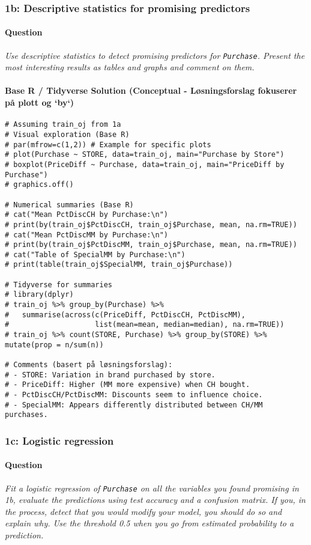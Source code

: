 \documentclass[12pt,a4paper]{article}
\newcommand{\Rcode}[1]{\texttt{#1}} %
\begin{document}
    \subsubsection{1b: Descriptive statistics for promising predictors}
        \paragraph{Question}
        \textit{Use descriptive statistics to detect promising predictors for \Rcode{Purchase}. Present the most interesting results as tables and graphs and comment on them.}
        \paragraph{Base R / Tidyverse Solution (Conceptual - Løsningsforslag fokuserer på plott og `by`)}
\begin{lstlisting}
# Assuming train_oj from 1a
# Visual exploration (Base R)
# par(mfrow=c(1,2)) # Example for specific plots
# plot(Purchase ~ STORE, data=train_oj, main="Purchase by Store")
# boxplot(PriceDiff ~ Purchase, data=train_oj, main="PriceDiff by Purchase")
# graphics.off()

# Numerical summaries (Base R)
# cat("Mean PctDiscCH by Purchase:\n")
# print(by(train_oj$PctDiscCH, train_oj$Purchase, mean, na.rm=TRUE))
# cat("Mean PctDiscMM by Purchase:\n")
# print(by(train_oj$PctDiscMM, train_oj$Purchase, mean, na.rm=TRUE))
# cat("Table of SpecialMM by Purchase:\n")
# print(table(train_oj$SpecialMM, train_oj$Purchase))

# Tidyverse for summaries
# library(dplyr)
# train_oj %>% group_by(Purchase) %>% 
#   summarise(across(c(PriceDiff, PctDiscCH, PctDiscMM), 
#                    list(mean=mean, median=median), na.rm=TRUE))
# train_oj %>% count(STORE, Purchase) %>% group_by(STORE) %>% mutate(prop = n/sum(n))

# Comments (basert på løsningsforslag):
# - STORE: Variation in brand purchased by store.
# - PriceDiff: Higher (MM more expensive) when CH bought.
# - PctDiscCH/PctDiscMM: Discounts seem to influence choice.
# - SpecialMM: Appears differently distributed between CH/MM purchases.
\end{lstlisting}

    \subsubsection{1c: Logistic regression}
        \paragraph{Question}
        \textit{Fit a logistic regression of \Rcode{Purchase} on all the variables you found promising in 1b, evaluate the predictions using test accuracy and a confusion matrix. If you, in the process, detect that you would modify your model, you should do so and explain why. Use the threshold 0.5 when you go from estimated probability to a prediction.}
\end{document}
